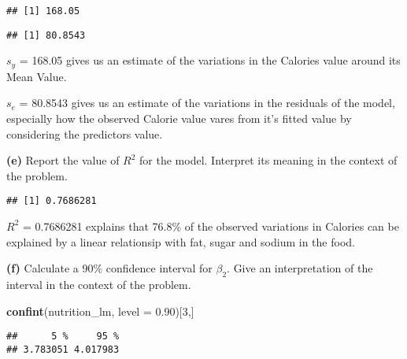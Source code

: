 \documentclass[
]{article}
\newenvironment{Shaded}{\begin{snugshade}}{\end{snugshade}}
\newcommand{\CommentTok}[1]{\textcolor[rgb]{0.56,0.35,0.01}{\textit{#1}}}
\newcommand{\DataTypeTok}[1]{\textcolor[rgb]{0.13,0.29,0.53}{#1}}
\newcommand{\DecValTok}[1]{\textcolor[rgb]{0.00,0.00,0.81}{#1}}
\newcommand{\FloatTok}[1]{\textcolor[rgb]{0.00,0.00,0.81}{#1}}
\newcommand{\KeywordTok}[1]{\textcolor[rgb]{0.13,0.29,0.53}{\textbf{#1}}}
\newcommand{\NormalTok}[1]{#1}
\newcommand{\OperatorTok}[1]{\textcolor[rgb]{0.81,0.36,0.00}{\textbf{#1}}}
\begin{document}
\begin{verbatim}
## [1] 168.05
\end{verbatim}

\begin{Shaded}
\end{Shaded}

\begin{verbatim}
## [1] 80.8543
\end{verbatim}

\(s_y\) = 168.05 gives us an estimate of the variations in the Calories
value around its Mean Value.

\(s_e\) = 80.8543 gives us an estimate of the variations in the
residuals of the model, especially how the observed Calorie value vares
from it's fitted value by considering the predictors value.

\textbf{(e)} Report the value of \(R^2\) for the model. Interpret its
meaning in the context of the problem.

\begin{Shaded}
\end{Shaded}

\begin{verbatim}
## [1] 0.7686281
\end{verbatim}

\(R^2\) = 0.7686281 explains that 76.8\% of the observed variations in
Calories can be explained by a linear relationsip with fat, sugar and
sodium in the food.

\textbf{(f)} Calculate a 90\% confidence interval for \(\beta_2\). Give
an interpretation of the interval in the context of the problem.

\begin{Shaded}
\begin{Highlighting}[]
\KeywordTok{confint}\NormalTok{(nutrition_lm, }\DataTypeTok{level =} \FloatTok{0.90}\NormalTok{)[}\DecValTok{3}\NormalTok{,]}
\end{Highlighting}
\end{Shaded}

\begin{verbatim}
##      5 %     95 % 
## 3.783051 4.017983
\end{verbatim}
\end{document}
